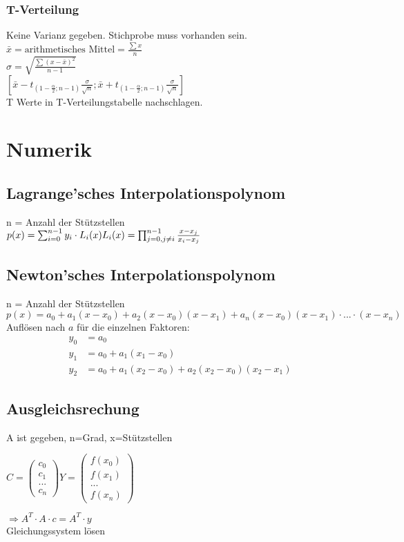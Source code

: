 \documentclass[a4paper, 10pt, landscape]{article}
\begin{document}
\begin{multicols}{5}
\begin{small}
		    	\subsubsection{T-Verteilung}
			    	Keine Varianz gegeben. Stichprobe muss vorhanden sein.\\
				    $\bar{x}=\text{arithmetisches Mittel}=\frac{\sum x}{n}$\\
				    $\sigma=\sqrt{\frac{\sum(x-\bar{x})^{2}}{n-1}}$\\
				    $[\bar{x}-t_{(1-\frac{\alpha}{2};n-1)}\frac{\sigma}{\sqrt{n}};\bar{x}+t_{(1-\frac{\alpha}{2};n-1)}\frac{\sigma}{\sqrt{n}}]$\\
				    T Werte in T-Verteilungstabelle nachschlagen.
	\section{Numerik}
		\subsection{Lagrange'sches Interpolationspolynom}
			n = Anzahl der Stützstellen\\
			$p(x) = \sum_{i=0}^{n-1} y_i \cdot L_i(x) \\
			L_i(x) = \prod_{j = 0, j \neq i}^{n-1} \frac{x - x_j}{x_i - x_j}$
		\subsection{Newton'sches Interpolationspolynom}
			n = Anzahl der Stützstellen\\
			$p(x) = a_0 + a_1(x - x_0) + a_2(x - x_0)(x - x_1) + a_n(x-x_0)(x - x_1)\cdot ... \cdot (x - x_n)$
			Auflösen nach $a$ für die einzelnen Faktoren:
			\begin{align*}
				y_0 &= a_0\\
				y_1 &= a_0 + a_1(x_1 - x_0)	\\
				y_2 &= a_0 + a_1(x_2 - x_0) + a_2(x_2 - x_0)(x_2 - x_1)
			\end{align*}
			\subsection{Ausgleichsrechung}
				A ist gegeben, n=Grad, x=Stützstellen
				\begin{multicols}{2}
					$C=\begin{pmatrix}
						c_0\\
						c_1\\
						...\\
						c_n
					\end{pmatrix}
					Y=\begin{pmatrix}
						f(x_0)\\
						f(x_1)\\
						...\\
						f(x_n)
					\end{pmatrix}$
				\end{multicols}
					$\Rightarrow A^T\cdot A\cdot c=A^T\cdot y$\\
					Gleichungssystem lösen
				

\end{small}
\end{multicols}
\end{document}
